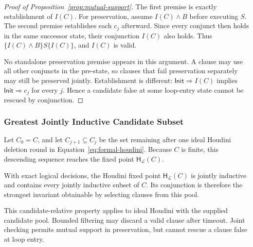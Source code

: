 \begin{proof}[Proof of Proposition~\ref{prop:mutual-support}]
The first premise is exactly establishment of \(I(C)\).  For preservation,
assume \(I(C)\wedge B\) before executing \(S\).  The second premise establishes
each \(c_j\) afterward.  Since every conjunct then holds in the same successor
state, their conjunction \(I(C)\) also holds.  Thus
\(\{I(C)\wedge B\}S\{I(C)\}\), and \(I(C)\) is valid.

No standalone preservation premise appears in this argument.  A clause may
use all other conjuncts in the pre-state, so clauses that fail preservation
separately may still be preserved jointly.  Establishment is different:
\(\mathsf{Init}\Rightarrow I(C)\) implies \(\mathsf{Init}\Rightarrow c_j\) for every \(j\).  Hence a
candidate false at some loop-entry state cannot be rescued by conjunction.
\end{proof}

\subsubsection{Greatest Jointly Inductive Candidate Subset}

Let \(C_0=C\), and let \(C_{j+1}\subseteq C_j\) be the set remaining after one
ideal Houdini deletion round in Equation~\eqref{eq:formal-houdini}.  Because \(C\) is
finite, this descending sequence reaches the fixed point
\(\mathsf H_{\mathcal L}(C)\).

\begin{theorem}
\label{thm:houdini-greatest}
With exact logical decisions, the Houdini fixed point
\(\mathsf H_{\mathcal L}(C)\) is jointly inductive and contains every jointly
inductive subset of \(C\).  Its conjunction is therefore the strongest
invariant obtainable by selecting clauses from this pool.
\end{theorem}
This candidate-relative property applies to ideal Houdini with the supplied
candidate pool. Bounded
filtering may discard a valid clause after timeout.  Joint checking permits
mutual support in preservation, but cannot rescue a clause false at loop entry.

